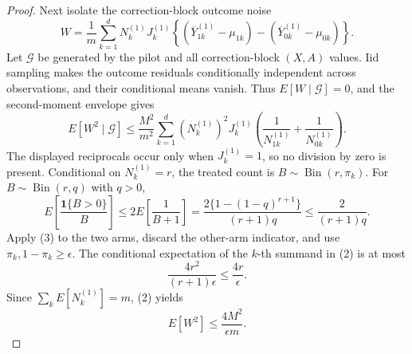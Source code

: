 \documentclass{article}
\begin{document}
\begin{proof}
Next isolate the correction-block outcome noise
\[
 W=\frac1m\sum_{k=1}^dN_k^{(1)}J_k^{(1)}
 \left\{(\overline Y_{1k}^{(1)}-\mu_{1k})
 -(\overline Y_{0k}^{(1)}-\mu_{0k})\right\}.
\]
Let \(\mathscr G\) be generated by the pilot and all correction-block \((X,A)\) values.  Iid sampling makes the outcome residuals conditionally independent across observations, and their conditional means vanish.  Thus \(E[W\mid\mathscr G]=0\), and the second-moment envelope gives
\[
 E[W^2\mid\mathscr G]
 \leq \frac{M^2}{m^2}\sum_{k=1}^d
 (N_k^{(1)})^2J_k^{(1)}
 \left(\frac1{N_{1k}^{(1)}}+\frac1{N_{0k}^{(1)}}\right). \tag{2}
\]
The displayed reciprocals occur only when \(J_k^{(1)}=1\), so no division by zero is present.  Conditional on \(N_k^{(1)}=r\), the treated count is \(B\sim\operatorname{Bin}(r,\pi_k)\).  For \(B\sim\operatorname{Bin}(r,q)\) with \(q>0\),
\[
 E\left[\frac{\mathbf1\{B>0\}}B\right]
 \leq2E\left[\frac1{B+1}\right]
 =\frac{2\{1-(1-q)^{r+1}\}}{(r+1)q}
 \leq\frac2{(r+1)q}. \tag{3}
\]
Apply (3) to the two arms, discard the other-arm indicator, and use \(\pi_k,1-\pi_k\geq\epsilon\).  The conditional expectation of the \(k\)-th summand in (2) is at most
\[
 \frac{4r^2}{(r+1)\epsilon}\leq\frac{4r}{\epsilon}.
\]
Since \(\sum_kE[N_k^{(1)}]=m\), (2) yields
\[
 E[W^2]\leq\frac{4M^2}{\epsilon m}. \tag{4}
\]


\end{proof}
\end{document}
